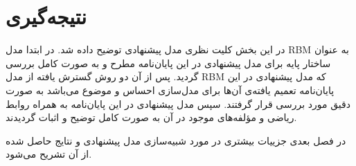 \section{نتیجه‌گیری}
در این بخش کلیت نظری مدل پیشنهادی توضیح داده شد. در ابتدا مدل
RBM
به عنوان ساختار پایه برای مدل پیشنهادی در این پایان‌‌نامه مطرح و به صورت کامل بررسی‌ گردید. پس از آن دو روش گسترش یافته از مدل
RBM
که مدل پیشنهادی در این پایان‌‌نامه تعمیم یافته‌ی ‌آن‌ها برای مدل‌سازی احساس و موضوع می‌‌باشد به صورت دقیق مورد بررسی‌ قرار گرفتند. سپس مدل پیشنهادی در این پایان‌‌نامه به همراه روابط ریاضی‌ و مؤلفه‌های موجود در آن به صورت کامل توضیح و اثبات گردیدند.

در فصل بعدی جزییات بیشتری در مورد شبیه‌سازی مدل‌ پیشنهادی و نتایج حاصل شده از آن تشریح می‌شود.






